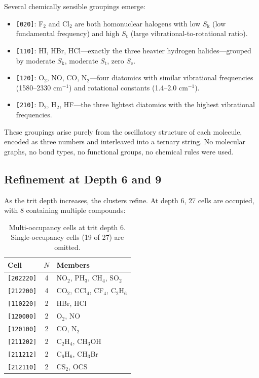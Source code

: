 \documentclass[11pt,twocolumn,a4paper]{article}
\theoremstyle{definition}
\theoremstyle{remark}
\newcommand{\Sk}{S_{\mathrm{k}}}
\newcommand{\St}{S_{\mathrm{t}}}
\newcommand{\Se}{S_{\mathrm{e}}}
\begin{document}
Several chemically sensible groupings emerge:

\begin{itemize}[nosep]
\item \texttt{[020]}: F$_2$ and Cl$_2$ are both homonuclear halogens with low $\Sk$ (low fundamental frequency) and high $\St$ (large vibrational-to-rotational ratio).
\item \texttt{[110]}: HI, HBr, HCl---exactly the three heavier hydrogen halides---grouped by moderate $\Sk$, moderate $\St$, zero $\Se$.
\item \texttt{[120]}: O$_2$, NO, CO, N$_2$---four diatomics with similar vibrational frequencies (1580--2330 cm$^{-1}$) and rotational constants (1.4--2.0 cm$^{-1}$).
\item \texttt{[210]}: D$_2$, H$_2$, HF---the three lightest diatomics with the highest vibrational frequencies.
\end{itemize}

These groupings arise purely from the oscillatory structure of each molecule, encoded as three numbers and interleaved into a ternary string. No molecular graphs, no bond types, no functional groups, no chemical rules were used.

\subsection{Refinement at Depth 6 and 9}

As the trit depth increases, the clusters refine. At depth 6, 27 cells are occupied, with 8 containing multiple compounds:

\begin{table}[H]
\centering
\caption{Multi-occupancy cells at trit depth 6. Single-occupancy cells (19 of 27) are omitted.}
\label{tab:depth6}
\begin{tabular}{lcp{8cm}}
\toprule
Cell & $N$ & Members \\
\midrule
\texttt{[202220]} & 4 & NO$_2$, PH$_3$, CH$_4$, SO$_2$ \\
\texttt{[212200]} & 4 & CO$_2$, CCl$_4$, CF$_4$, C$_2$H$_6$ \\
\texttt{[110220]} & 2 & HBr, HCl \\
\texttt{[120000]} & 2 & O$_2$, NO \\
\texttt{[120100]} & 2 & CO, N$_2$ \\
\texttt{[211202]} & 2 & C$_2$H$_4$, CH$_3$OH \\
\texttt{[211212]} & 2 & C$_6$H$_6$, CH$_3$Br \\
\texttt{[212110]} & 2 & CS$_2$, OCS \\
\bottomrule
\end{tabular}
\end{table}
\end{document}

